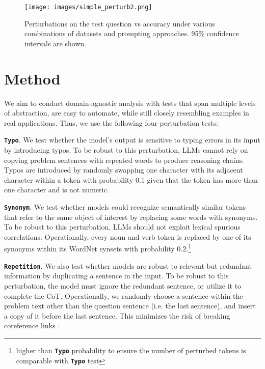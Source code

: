 \documentclass[11pt]{article}
\begin{document}
\begin{figure*}[t]
    \centering
    \captionsetup{justification=centering}
    \texttt{[image: images/simple\_perturb2.png]}
    \caption{Perturbations on the test question vs accuracy under various combinations of datasets and prompting approaches. 95\% confidence intervals are shown.}
    \label{fig:simple_perturb}
\end{figure*}

\section{Method}\label{sec:tests}

We aim to conduct domain-agnostic analysis with tests that span multiple levels of abstraction, are easy to automate, while still closely resembling examples in real applications. Thus, we use the following four perturbation tests:

\noindent \textbf{\texttt{Typo}}. We test whether the model's output is sensitive to typing errors in its input by introducing typos. To be robust to this perturbation, LLMs cannot rely on copying problem sentences with repeated words to produce reasoning chains. Typos are introduced by randomly swapping one character with its adjacent character within a token with probability $0.1$ given that the token has more than one character and is not numeric.

\noindent \textbf{\texttt{Synonym}}. We test whether models could recognize semantically similar tokens that refer to the same object of interest by replacing some words with synonyms. To be robust to this perturbation, LLMs should not exploit lexical spurious correlations. Operationally, every noun and verb token is replaced by one of its synonyms within its WordNet \cite{miller-1992-wordnet} synsets with probability $0.2$.\footnote{higher than \textbf{\texttt{Typo}} probability to ensure the number of perturbed tokens is comparable with \textbf{\texttt{Typo}} test}

\noindent \textbf{\texttt{Repetition}}. We also test whether models are robust to relevant but redundant information by duplicating a sentence in the input. To be robust to this perturbation, the model must ignore the redundant sentence, or utilize it to complete the CoT. Operationally, we randomly choose a sentence within the problem text other than the question sentence (i.e. the last sentence), and insert a copy of it before the last sentence. This minimizes the risk of breaking coreference links \cite{jia-liang-2017-adversarial}.
\end{document}

